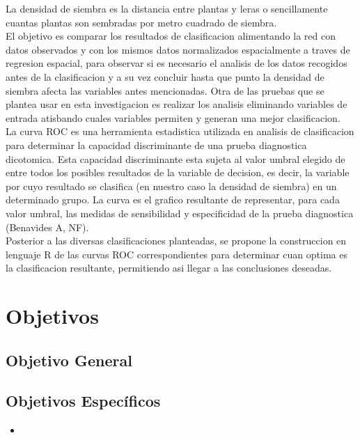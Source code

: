 La densidad de siembra es la distancia entre plantas y leras o sencillamente cuantas plantas son sembradas por metro cuadrado de siembra.\\

El objetivo es comparar los resultados de clasificacion alimentando la red con datos observados y con los mismos datos normalizados espacialmente a traves de regresion espacial, para observar si es necesario el analisis de los datos recogidos antes de la clasificacion y a su vez concluir hasta que punto la densidad de siembra afecta las variables antes mencionadas. Otra de las pruebas que se plantea usar en esta investigacion es realizar los analisis eliminando variables de entrada atisbando cuales variables permiten y generan una mejor clasificacion.\\

La curva ROC es una herramienta estadistica utilizada en analisis de clasificacion para determinar la capacidad discriminante de una prueba diagnostica dicotomica. Esta capacidad discriminante esta sujeta al valor umbral elegido de entre todos los posibles resultados de la variable de decision, es decir, la variable por cuyo resultado se clasifica (en nuestro caso la densidad de siembra) en un determinado grupo. La curva es el grafico resultante de representar, para cada valor umbral, las medidas de sensibilidad y especificidad de la prueba diagnostica (Benavides A, NF).\\

Posterior a las diversas clasificaciones planteadas, se propone la construccion en lenguaje R de las curvas ROC correspondientes para determinar cuan optima es la clasificacion resultante, permitiendo asi llegar a las conclusiones deseadas. 

\section{Objetivos}

\subsection{Objetivo General}



\subsection{Objetivos Espec\'ificos}
 
\begin{itemize}
\item  
\end{itemize}

